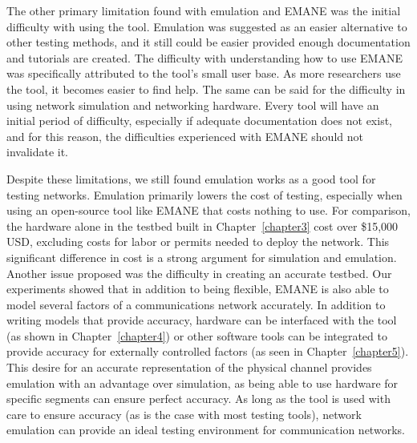 The other primary limitation found with emulation and EMANE was the initial difficulty with using the tool.
Emulation was suggested as an easier alternative to other testing methods, and it still could be easier provided enough documentation and tutorials are created.
The difficulty with understanding how to use EMANE was specifically attributed to the tool's small user base.
As more researchers use the tool, it becomes easier to find help.
The same can be said for the difficulty in using network simulation and networking hardware.
Every tool will have an initial period of difficulty, especially if adequate documentation does not exist, and for this reason, the difficulties experienced with EMANE should not invalidate it.\par
Despite these limitations, we still found emulation works as a good tool for testing networks.
Emulation primarily lowers the cost of testing, especially when using an open-source tool like EMANE that costs nothing to use.
For comparison, the hardware alone in the testbed built in Chapter~\ref{chapter3} cost over \$15,000 USD, excluding costs for labor or permits needed to deploy the network.
This significant difference in cost is a strong argument for simulation and emulation.
Another issue proposed was the difficulty in creating an accurate testbed.
Our experiments showed that in addition to being flexible, EMANE is also able to model several factors of a communications network accurately.
In addition to writing models that provide accuracy, hardware can be interfaced with the tool (as shown in Chapter~\ref{chapter4}) or other software tools can be integrated to provide accuracy for externally controlled factors (as seen in Chapter~\ref{chapter5}).
This desire for an accurate representation of the physical channel provides emulation with an advantage over simulation, as being able to use hardware for specific segments can ensure perfect accuracy. 
As long as the tool is used with care to ensure accuracy (as is the case with most testing tools), network emulation can provide an ideal testing environment for communication networks.

